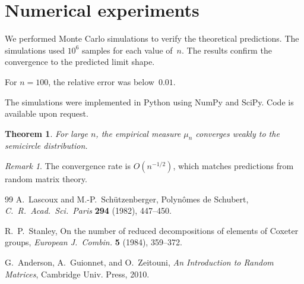 \documentclass{amsart}
\theoremstyle{plain}
\newtheorem{theorem}{Theorem}[section]
\theoremstyle{definition}
\theoremstyle{remark}
\newtheorem*{remark}{Remark}
\begin{document}
\section{Numerical experiments}
\label{sec:numerical}
    We performed Monte Carlo simulations to verify the theoretical
    predictions.  The simulations used $10^6$ samples for each value
    of~$n$.    The results confirm the convergence to the predicted
    limit shape.

    For $n = 100$, the relative error was below~$0.01$.

    The simulations were implemented in Python using NumPy and SciPy.
    Code is available upon request.

\begin{theorem}
For large $n$, the empirical measure $\mu_n$ converges weakly to the
semicircle distribution.
\end{theorem}

\begin{remark}
The convergence rate is $O(n^{-1/2})$, which matches predictions from
random matrix theory.
\end{remark}

\begin{thebibliography}{99}
 A.~Lascoux and M.-P.~Sch\"utzenberger,
  Polyn\^omes de Schubert,
  \emph{C.~R.~Acad.~Sci.~Paris} \textbf{294} (1982), 447--450.

 R.~P.~Stanley,
  On the number of reduced decompositions of elements of Coxeter groups,
  \emph{European J.~Combin.} \textbf{5} (1984), 359--372.

 G.~Anderson, A.~Guionnet, and O.~Zeitouni,
  \emph{An Introduction to Random Matrices},
  Cambridge Univ. Press, 2010.
\end{thebibliography}
\end{document}
